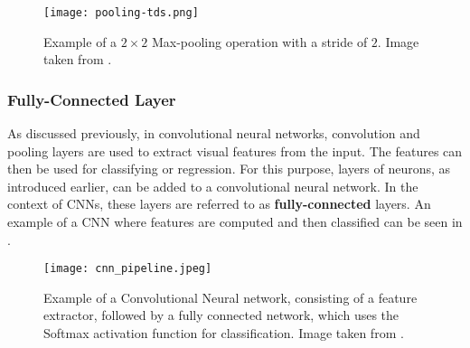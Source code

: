 \begin{figure}[htb!]
    \centering
    \texttt{[image: pooling-tds.png]}
    \caption{Example of a $2 \times 2$ Max-pooling operation with a stride of $2$. Image taken from \cite{cornelisse_intuitive_2018}.}
    \label{fig:pooling-tds}
\end{figure}




\subsubsection{Fully-Connected Layer}
As discussed previously, in convolutional neural networks, convolution and pooling layers are used to extract visual features from the input.
The features can then be used for classifying or regression.
For this purpose, layers of neurons, as introduced earlier, can be added to a convolutional neural network.
In the context of CNNs, these layers are referred to as \textbf{fully-connected} layers.
An example of a CNN where features are computed and then classified can be seen in .

\begin{figure}[htb!]
    \centering
    \texttt{[image: cnn\_pipeline.jpeg]}
    \caption{Example of a Convolutional Neural network, consisting of a feature extractor, followed by a fully connected network, which uses the Softmax activation function for classification. Image taken from \cite{saha_comprehensive_2018}.}
    \label{fig:cnn_pipeline}
\end{figure}